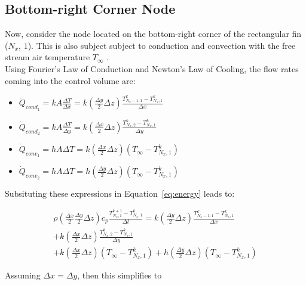 \documentclass{article}
\newcommand{\ddfrac}[2]{\frac{\displaystyle #1}{\displaystyle #2}}
\begin{document}
\subsection{Bottom-right Corner Node}
Now, consider the node located on the bottom-right corner of the rectangular fin ($N_x$, $1$). This is also subject subject to conduction and convection with the free stream air temperature $T_{\infty}$ .\\

Using Fourier's Law of Conduction and Newton's Law of Cooling, the flow rates coming into the control volume are:

\begin{itemize}
    \item $\dot{Q}_{cond_{1}} = kA\ddfrac{\Delta T}{\Delta x} = k(\ddfrac{\Delta y}{2} \Delta z) \ddfrac{T_{N_x-1,1}^k - T_{N_x,1}^k}{\Delta x}$
    \item $\dot{Q}_{cond_{2}} = kA\ddfrac{\Delta T}{\Delta y} = k(\ddfrac{\Delta x}{2} \Delta z) \ddfrac{T_{N_x,2}^k - T_{N_x,1}^k}{\Delta y}$
    \item $\dot{Q}_{conv_{1}} = hA\Delta T = k(\ddfrac{\Delta x}{2} \Delta z) \left(T_{\infty} - T_{N_x,1}^k\right)$
    \item $\dot{Q}_{conv_{2}} = hA\Delta T = h(\ddfrac{\Delta y}{2} \Delta z)\left(T_{\infty} - T_{N_x,1}^k\right)$
\end{itemize}

Subsituting these expressions in Equation~\eqref{eq:energy} leads to:

\begin{multline*}
    \rho\left(\ddfrac{\Delta x}{2} \ddfrac{\Delta y}{2} \Delta z\right) c_p \ddfrac{T_{N_x,1}^{k+1} - T_{N_x,1}^k}{\Delta t} = k(\ddfrac{\Delta y}{2} \Delta z) \ddfrac{T_{N_x-1,1}^k - T_{N_x,1}^k}{\Delta x} \\
    + k(\ddfrac{\Delta x}{2} \Delta z) \ddfrac{T_{N_x,2}^k - T_{N_x,1}^k}{\Delta y} \\
    + k(\ddfrac{\Delta x}{2} \Delta z) \left(T_{\infty} - T_{N_x,1}^k\right)
    + h(\ddfrac{\Delta y}{2} \Delta z)\left(T_{\infty} - T_{N_x,1}^k\right)
\end{multline*}

Assuming $\Delta x = \Delta y$, then this simplifies to 
\begin{center}
    \noindent {}        
\end{center}
\end{document}
